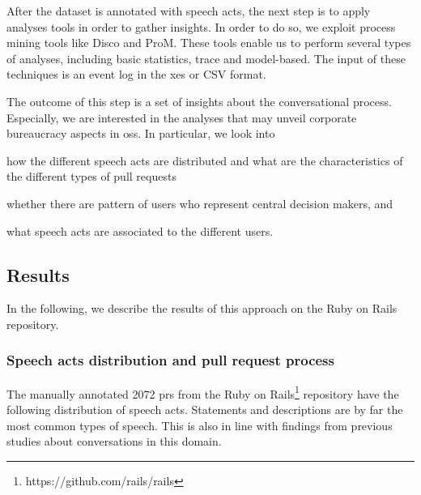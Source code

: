 After the dataset is annotated with speech acts, the next step is to apply analyses tools in order to gather insights. 
In order to do so, we exploit process mining tools like Disco and ProM. These tools enable us to perform several types of analyses, including basic statistics, trace and model-based. The input of these techniques is an event log in the \gls{xes} or CSV format. 

The outcome of this step is a set of insights about the conversational process. Especially, we are interested in the analyses that may unveil corporate bureaucracy aspects in \gls{oss}. In particular, we look into 
\begin{inparaenum}[\itshape i)]
	\item how the different speech acts are distributed and what are the characteristics of the different types of pull requests
	\item whether there are pattern of users who represent central decision makers, and
	\item what speech acts are associated to the different users.
\end{inparaenum}



\subsection{Results}

In the following, we describe the results of this approach on the Ruby on Rails repository. 

\subsubsection{Speech acts distribution and pull request process}

The manually annotated 2072 \glspl{pr} from the Ruby on Rails\footnote{https://github.com/rails/rails} repository have the following distribution of speech acts. Statements and descriptions are by far the most common types of speech. This is also in line with findings from previous studies \citep{DBLP:journals/cscw/RipocheS06,DBLP:conf/sigsoft/WoodRAM18} about conversations in this domain. 

